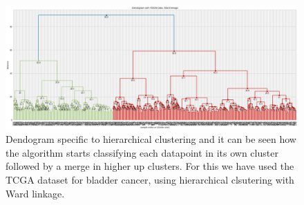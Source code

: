 \begin{appendices}
    \begin{figure}[!htb]                                  
        \centering\includegraphics[width=1.0\textwidth,height=1.0\textheight,keepaspectratio]{Images/Clustering/dendogram.png}
          \caption{Dendogram specific to hierarchical clustering and it can be seen how the algorithm starts classifying each datapoint in its own cluster followed by a merge in higher up clusters. For this we have used the TCGA dataset for bladder cancer, using hierarchical clsutering with Ward linkage.}
          \label{fig:dendogram}
      \end{figure}
      \FloatBarrier

\end{appendices}